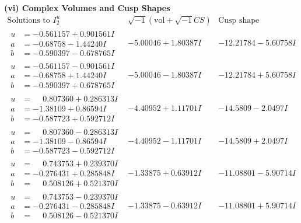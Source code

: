 \documentclass[1p]{elsarticle_modified}
\theoremstyle{definition}
\newcommand{\I}{\sqrt{-1}}
\begin{document}
\newpage\flushleft \textbf{(vi) Complex Volumes and Cusp Shapes}
$$\begin{array}{c|c|c}  
\text{Solutions to }I^u_{2}& \I (\text{vol} + \sqrt{-1}CS) & \text{Cusp shape}\\
 \hline 
\begin{aligned}
u &= -0.561157 + 0.901561 I \\
a &= -0.68758 - 1.44240 I \\
b &= -0.590397 - 0.678765 I\end{aligned}
 & -5.00046 + 1.80387 I & -12.21784 - 5.60758 I \\ \hline\begin{aligned}
u &= -0.561157 - 0.901561 I \\
a &= -0.68758 + 1.44240 I \\
b &= -0.590397 + 0.678765 I\end{aligned}
 & -5.00046 - 1.80387 I & -12.21784 + 5.60758 I \\ \hline\begin{aligned}
u &= \phantom{-}0.807360 + 0.286313 I \\
a &= -1.38109 + 0.86594 I \\
b &= -0.587723 + 0.592712 I\end{aligned}
 & -4.40952 + 1.11701 I & -14.5809 - 2.0497 I \\ \hline\begin{aligned}
u &= \phantom{-}0.807360 - 0.286313 I \\
a &= -1.38109 - 0.86594 I \\
b &= -0.587723 - 0.592712 I\end{aligned}
 & -4.40952 - 1.11701 I & -14.5809 + 2.0497 I \\ \hline\begin{aligned}
u &= \phantom{-}0.743753 + 0.239370 I \\
a &= -0.276431 + 0.285848 I \\
b &= \phantom{-}0.508126 + 0.521370 I\end{aligned}
 & -1.33875 + 0.63912 I & -11.08801 - 5.90714 I \\ \hline\begin{aligned}
u &= \phantom{-}0.743753 - 0.239370 I \\
a &= -0.276431 - 0.285848 I \\
b &= \phantom{-}0.508126 - 0.521370 I\end{aligned}
 & -1.33875 - 0.63912 I & -11.08801 + 5.90714 I \\ \hline\begin{aligned}

\end{aligned}
\end{array}$$
\end{document}
